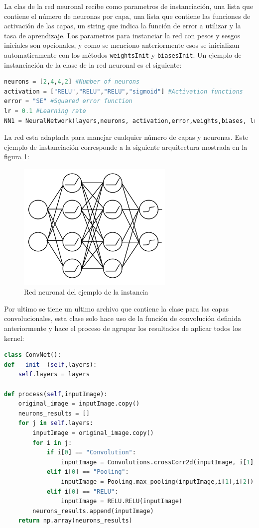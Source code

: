 \documentclass{article}
\begin{document}
La clas de la red neuronal recibe como parametros de instanciación, una lista que contiene el número de neuronas por capa, una lista que contiene las funciones de activación de las capas, un string que indica la función de error a utilizar y la tasa de aprendizaje. Los parametros para instanciar la red con pesos y sesgos iniciales son opcionales, y como se menciono anteriormente esos se inicializan automaticamente
con los métodos \texttt{weightsInit} y \texttt{biasesInit}.
Un ejemplo de instanciación de la clase de la red neuronal es el siguiente:
\begin{lstlisting}[language=python]
neurons = [2,4,4,2] #Number of neurons
activation = ["RELU","RELU","RELU","sigmoid"] #Activation functions
error = "SE" #Squared error function
lr = 0.1 #Learning rate
NN1 = NeuralNetwork(layers,neurons, activation,error,weights,biases, lr)
\end{lstlisting}
La red esta adaptada para manejar cualquier número de capas y neuronas. 
Este ejemplo de instanciación corresponde a la siguiente arquitectura mostrada en la figura \ref{inst}:
\begin{figure}[H]
    \centering
    \includegraphics[width=75mm]{inst.png}
    \caption{Red neuronal del ejemplo de la instancia}
    \label{inst}
\end{figure}
Por ultimo se tiene un ultimo archivo que contiene la clase para las capas convolucionales, esta clase solo hace uso de la función de convolución definida anteriormente y hace el proceso de agrupar los resultados de aplicar todos los kernel:
\begin{lstlisting}[language=python]
class ConvNet():
def __init__(self,layers):
    self.layers = layers

def process(self,inputImage):
    original_image = inputImage.copy()
    neurons_results = []
    for j in self.layers:
        inputImage = original_image.copy()
        for i in j:
            if i[0] == "Convolution":
                inputImage = Convolutions.crossCorr2d(inputImage, i[1], padding=i[2])
            elif i[0] == "Pooling":
                inputImage = Pooling.max_pooling(inputImage,i[1],i[2])
            elif i[0] == "RELU":
                inputImage = RELU.RELU(inputImage)
        neurons_results.append(inputImage)
    return np.array(neurons_results)
\end{lstlisting}
\end{document}
